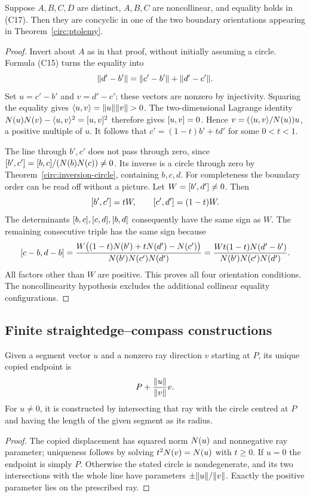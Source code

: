\begin{theorem}
\label{circ:ptolemy-converse}
Suppose $A,B,C,D$ are distinct, $A,B,C$ are noncollinear, and equality
holds in (C17).  Then they are concyclic in one of the two boundary
orientations appearing in Theorem~\ref{circ:ptolemy}.
\end{theorem}
\begin{proof}
Invert about $A$ as in that proof, without initially assuming a circle.
Formula (C15) turns the equality into
\[
 \lVert d'-b'\rVert=\lVert c'-b'\rVert+\lVert d'-c'\rVert.
\]
Set $u=c'-b'$ and $v=d'-c'$; these vectors are nonzero by injectivity.
Squaring the equality gives $\langle u,v\rangle=\lVert u\rVert\lVert v\rVert>0$.
The two-dimensional Lagrange identity
$N(u)N(v)-\langle u,v\rangle^2=[u,v]^2$ therefore gives
$[u,v]=0$.  Hence
$v=(\langle u,v\rangle/N(u))u$, a positive multiple of $u$.
It follows that $c'=(1-t)b'+td'$ for some $0<t<1$.

The line through $b',c'$ does not pass through zero, since
$[b',c']=[b,c]/(N(b)N(c))\ne0$.
Its inverse is a circle through zero by
Theorem~\ref{circ:inversion-circle}, containing $b,c,d$.
For completeness the boundary order can be read off without a picture.
Let $W=[b',d']\ne0$.  Then
\[
 [b',c']=tW,\qquad
 [c',d']=(1-t)W.
\]
The determinants $[b,c],[c,d],[b,d]$ consequently have the
same sign as $W$.  The remaining consecutive triple has the same sign
because
\[
 [c-b,d-b]
 =\frac{W\bigl((1-t)N(b')+tN(d')-N(c')\bigr)}{N(b')N(c')N(d')}
 =\frac{Wt(1-t)N(d'-b')}{N(b')N(c')N(d')}.
\]
All factors other than $W$ are positive.  This proves all four orientation
conditions.  The noncollinearity hypothesis excludes the additional
collinear equality configurations.
\end{proof}

\subsection{Finite straightedge--compass constructions}

\begin{theorem}
\label{circ:elementary-constructions}
Given a segment vector $u$ and a nonzero ray direction $v$ starting at
$P$, its unique copied endpoint is
\[
 P+\frac{\lVert u\rVert}{\lVert v\rVert}v.
\]
For $u\ne0$, it is constructed by intersecting that ray with the circle
centred at $P$ and having the length of the given segment as its radius.
\end{theorem}
\begin{proof}
The copied displacement has squared norm $N(u)$ and nonnegative
ray parameter; uniqueness follows by solving $t^2N(v)=N(u)$
with $t\ge0$.  If $u=0$ the endpoint is simply $P$.
Otherwise the stated circle is nondegenerate, and its two intersections
with the whole line have parameters $\pm\lVert u\rVert/\lVert v\rVert$.
Exactly the positive parameter lies on the prescribed ray.
\end{proof}


